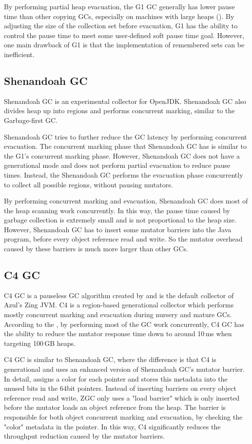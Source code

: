 By performing partial heap evacuation, the G1 GC generally has lower pause time
than other copying GCs, especially on machines with large heaps (\cite{detlefs2004garbage}).
By adjusting the size of the collection set before evacuation, G1 has the ability
to control the pause time to meet some user-defined soft pause time goal.
However, one main drawback of G1 is that the implementation of remembered sets can be inefficient.

\subsection{Shenandoah GC}

Shenandoah GC is an experimental collector for OpenJDK.
Shenandoah GC also divides heap up into regions and performs concurrent marking,
similar to the Garbage-first GC.

Shenandoah GC tries to further reduce the GC latency by performing concurrent
evacuation. The concurrent marking phase that Shenandoah GC has is similar to
the G1's concurrent marking phase. However, Shenandoah GC does not have a generational
mode and does not perform partial evacuation to reduce pause times.
Instead, the Shenandoah GC performs the evacuation phase concurrently to collect
all possible regions, without pausing mutators.

By performing concurrent marking and evacuation, Shenandoah GC does most of the
heap scanning work concurrently. In this way, the pause time caused by garbage collection
is extremely small and is not proportional to the heap size.
However, Shenandoah GC has to insert some mutator barriers into the Java program,
before every object reference read and write. So the mutator overhead caused by
these barriers is much more larger than other GCs.

\subsection{C4 GC}

C4 GC is a pauseless GC algorithm created by \cite{tene2011c4} and is the default
collector of Azul's Zing JVM. C4 is a region-based generational collector which
performs mostly concurrent marking and evacuation during nursery and mature GCs.
According to the \cite{tene2011c4},
by performing most of the GC work concurrently, C4 GC has the ability to reduce the
mutator response time down to around 10\,ms when targeting 100\,GB heaps.

C4 GC is similar to Shenandoah GC, where the difference is that C4 is generational
and uses an enhanced version of Shenandoah GC's mutator barrier.
In detail, assigns a color for each pointer and stores this metadata into the
unused bits in the 64bit pointers.
Instead of inserting barriers on every object reference read and write,
ZGC only uses a "load barrier" which is only inserted before the mutator loads an
object reference from the heap. The barrier is responsible for both object concurrent marking
and evacuation, by checking the "color" metadata in the pointer.
In this way, C4 significantly reduces the throughput reduction caused by the mutator
barriers.

